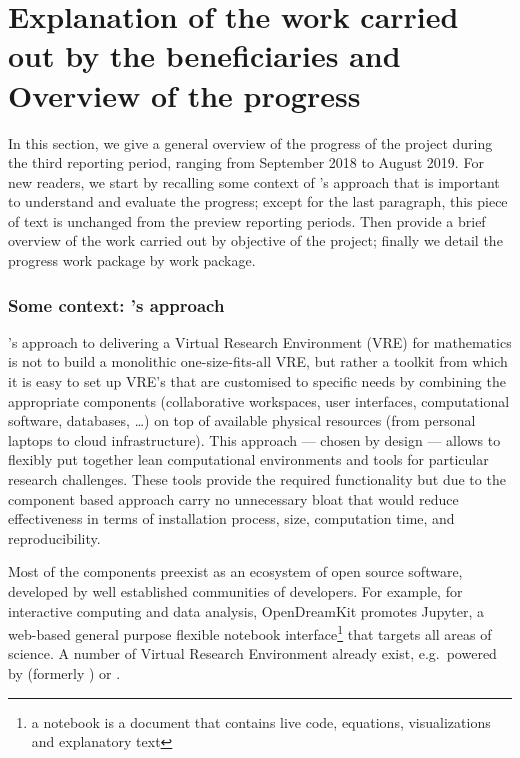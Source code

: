 \section{Explanation of the work carried out by the beneficiaries and Overview of the progress}

In this section, we give a general overview of the progress of the
project during the third reporting period, ranging from September 2018
to August 2019. For new readers, we start by recalling some context of
\ODK's approach that is important to understand and evaluate the
progress; except for the last paragraph, this piece of text is
unchanged from the preview reporting periods. Then provide a brief
overview of the work carried out by objective of the project; finally
we detail the progress work package by work package.

\subsubsection*{Some context: \ODK's approach}
\ODK's approach to delivering a Virtual Research Environment (VRE) for
mathematics is not to build a monolithic one-size-fits-all VRE, but
rather a toolkit from which it is easy to set up VRE's that are
customised to specific needs by combining the appropriate components
(collaborative workspaces, user interfaces, computational software,
databases, \dots) on top of available physical resources (from
personal laptops to cloud infrastructure). This approach --- chosen by
design --- allows to flexibly put together lean computational
environments and tools for particular research challenges. These tools
provide the required functionality but due to the component based
approach carry no unnecessary bloat that would reduce effectiveness in
terms of installation process, size, computation time, and
reproducibility.

Most of the components preexist as an ecosystem of open source
software, developed by well established communities of developers. For
example, for interactive computing and data analysis, OpenDreamKit
promotes Jupyter, a web-based general purpose flexible notebook
interface\footnote{a notebook is a document that contains live code,
  equations, visualizations and explanatory text} that targets all
areas of science. A number of Virtual Research Environment already
exist, e.g.\ powered by \cocalc (formerly \SMC) or \JupyterHub.

